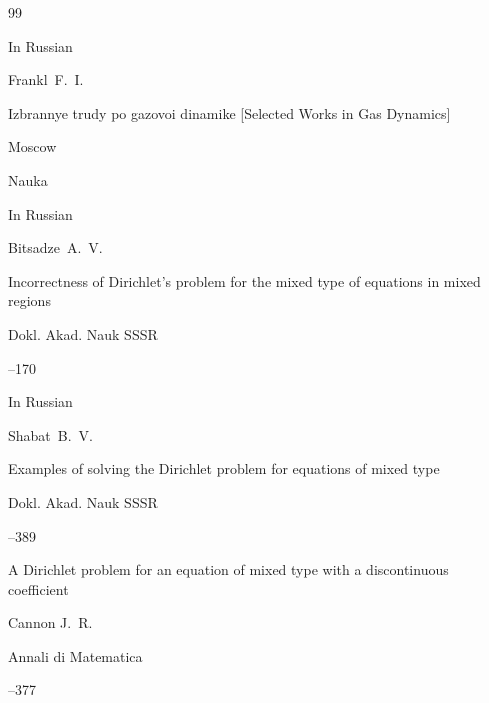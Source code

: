 \begin{thebibliography}{99}

\lang In Russian

\by Frankl~F.~I.

\book Izbrannye trudy po gazovoi dinamike \rm [Selected Works in Gas Dynamics]

\publaddr Moscow

\publ Nauka








\lang In Russian

\by Bitsadze~A.~V.

\paper Incorrectness of Dirichlet's problem for the mixed type of equations in mixed regions

\jour Dokl. Akad. Nauk SSSR 




--170






\lang In Russian

\by Shabat~B.~V.

\paper Examples of solving the Dirichlet problem for equations of mixed type

\jour Dokl. Akad. Nauk SSSR 




--389






\paper A Dirichlet problem for an equation of mixed type with a discontinuous coefficient 

\by Cannon J.~R.

\jour  Annali di Matematica




--377







\end{thebibliography}
